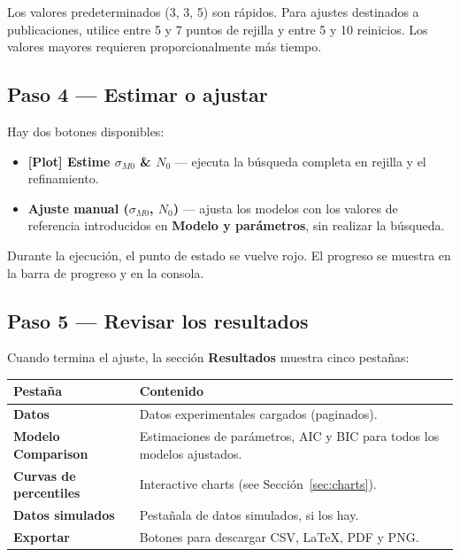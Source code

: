 \documentclass[11pt,a4paper]{article}
\newcommand{\sMzero}{\ensuremath{\sigma_{M0}}}
\newcommand{\Nzero}{\ensuremath{N_0}}
\begin{document}
\begin{notebox}
Los valores predeterminados (3, 3, 5) son rápidos. Para ajustes destinados a publicaciones, utilice entre 5 y 7 puntos de rejilla y entre 5 y 10 reinicios. Los valores mayores requieren proporcionalmente más tiempo.
\end{notebox}

\subsection{Paso 4 --- Estimar o ajustar}

Hay dos botones disponibles:

\begin{itemize}[leftmargin=1.4em]
  \item \textbf{\textcolor{warnhl}{\textbf{[Plot]} Estime $\sMzero$ \& $\Nzero$}} --- ejecuta la búsqueda completa en rejilla y el refinamiento.
  \item \textbf{\textcolor{accent}{Ajuste manual ($\sMzero$, $\Nzero$)}} --- ajusta los modelos con los valores de referencia introducidos en \textbf{Modelo y parámetros}, sin realizar la búsqueda.
\end{itemize}

Durante la ejecución, el punto de estado se vuelve \textcolor{redhl}{rojo}. El progreso se muestra en la barra de progreso y en la consola.

\subsection{Paso 5 --- Revisar los resultados}

Cuando termina el ajuste, la sección \textbf{Resultados} muestra cinco pestañas:

\begin{center}
\begin{tabularx}{\textwidth}{lX}
\toprule
\textbf{Pestaña} & \textbf{Contenido} \\
\midrule
\textbf{Datos} & Datos experimentales cargados (paginados). \\
\textbf{Modelo Comparison} & Estimaciones de parámetros, AIC y BIC para todos los modelos ajustados. \\
\textbf{Curvas de percentiles} & Interactive charts (see Sección~\ref{sec:charts}). \\
\textbf{Datos simulados} & Pestañala de datos simulados, si los hay. \\
\textbf{Exportar} & Botones para descargar CSV, LaTeX, PDF y PNG. \\
\bottomrule
\end{tabularx}
\end{center}
\end{document}
